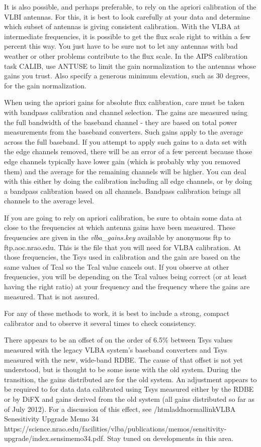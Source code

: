 \documentclass{report}
\begin{document}
\begin{list}{}{\parsep .5em  \itemsep .5em }
It is also possible, and perhaps preferable, to rely on the apriori
calibration of the VLBI antennas.  For this, it is best to look
carefully at your data and determine which subset of antennas is
giving consistent calibration.  With the VLBA at intermediate
frequencies, it is possible to get the flux scale right to within a
few percent this way.  You just have to be sure not to let any
antennas with bad weather or other problems contribute to the flux
scale.  In the AIPS calibration task CALIB, use ANTUSE to limit the
gain normalization to the antennas whose gains you trust.  Also
specify a generous minimum elevation, such as 30 degrees, for the gain
normalization.

When using the apriori gains for absolute flux calibration, care must
be taken with bandpass calibration and channel selection.  The gains
are measured using the full bandwidth of the baseband channel - they
are based on total power measurements from the baseband converters.
Such gains apply to the average across the full baseband.  If you
attempt to apply such gains to a data set with the edge channels
removed, there will be an error of a few percent because those edge
channels typically have lower gain (which is probably why you removed
them) and the average for the remaining channels will be higher.  You
can deal with this either by doing the calibration including all edge
channels, or by doing a bandpass calibration based on all channels.
Bandpass calibration brings all channels to the average level.

If you are going to rely on apriori calibration, be sure to obtain
some data at close to the frequencies at which antenna gains have been
measured.  These frequencies are given in the {\sl vlba\_gains.key}
available by anonymous ftp to ftp.aoc.nrao.edu.  This is the file that
you will need for VLBA calibration.  At those frequencies, the Tsys
used in calibration and the gain are based on the same values of Tcal
so the Tcal value cancels out.  If you observe at other frequencies,
you will be depending on the Tcal values being correct (or at least
having the right ratio) at your frequency and the frequency where the
gains are measured.  That is not assured.

For any of these methods to work, it is best to include a strong,
compact calibrator and to observe it several times to check
consistency.

There appears to be an offset of on the order of 6.5\% between Tsys
values measured with the legacy VLBA system's baseband converters and
Tsys measured with the new, wide-band RDBE. The cause of that offset
is not yet understood, but is thought to be some issue with the old
system.  During the transition, the gains distributed are for the old
system.  An adjustment appears to be required to for data data
calibrated using Tsys measured either by the RDBE or by DiFX and gains
derived from the old system (all gains distributed so far as of July
2012).  For a discussion of this effect, see /htmladdnormallink{VLBA
Senesitivity Upgrade Memo 34}{
https://science.nrao.edu/facilities/vlba/publications/memos/sensitivity-upgrade/index.sensimemo34.pdf}.
Stay tuned on developments in this area.


\end{list}
\end{document}
